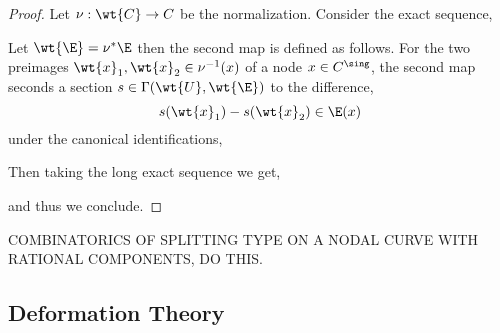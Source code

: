 \documentclass[12pt]{article}
\begin{document}
\begin{proof}
Let $\nu : \wt{C} \to C$ be the normalization. Consider the exact sequence,
\begin{center}
\end{center}
Let $\wt{\E} = \nu^* \E$ then the second map is defined as follows. For the two preimages $\wt{x}_1, \wt{x}_2 \in \nu^{-1}(x)$ of a node $x \in C^{\sing}$, the second map seconds a section $s \in \Gamma(\wt{U}, \wt{\E})$ to the difference,
\[ s(\wt{x}_1) - s(\wt{x}_2) \in \E(x) \]
under the canonical identifications,
\begin{center}
\end{center}
Then taking the long exact sequence we get,
\begin{center}
\end{center}
and thus we conclude.
\end{proof}

\begin{prop}
COMBINATORICS OF SPLITTING TYPE ON A NODAL CURVE WITH RATIONAL COMPONENTS, DO THIS.
\end{prop}

\subsection{Deformation Theory}
\end{document}

